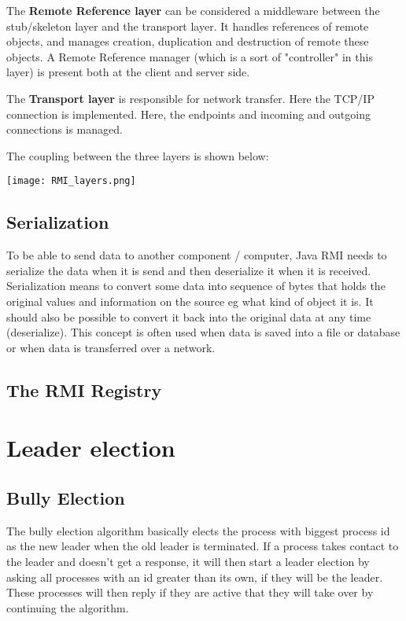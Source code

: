 The \textbf{Remote Reference layer} can be considered a middleware between the stub/skeleton layer and the transport layer. It handles references of remote objects, and manages creation, duplication and destruction of remote these objects. A Remote Reference manager (which is a sort of "controller" in this layer) is present both at the client and server side.

The \textbf{Transport layer} is responsible for network transfer. Here the TCP/IP connection is implemented. Here, the endpoints and incoming and outgoing connections is managed.

The coupling between the three layers is shown below:

\begin{center}
	\texttt{[image: RMI\_layers.png]}
\end{center}

\subsection{Serialization}
To be able to send data to another component / computer, Java RMI needs to serialize the data when it is send and then deserialize it when it is received. 
Serialization means to convert some data into sequence of bytes that holds the original values and information on the source eg what kind of object it is. It should also be possible to convert it back into the original data at any time (deserialize). This concept is often used when data is saved into a file or database or when data is transferred over a network.

\subsection{The RMI Registry}

\section{Leader election}

\subsection{Bully Election}
The bully election algorithm basically elects the process with biggest process id as the new leader when the old leader is terminated. 
If a process takes contact to the leader and doesn't get a response, it will then start a leader election by asking all processes with an id greater than its own, if they will be the leader. These processes will then reply if they are active that they will take over by continuing the algorithm. 

